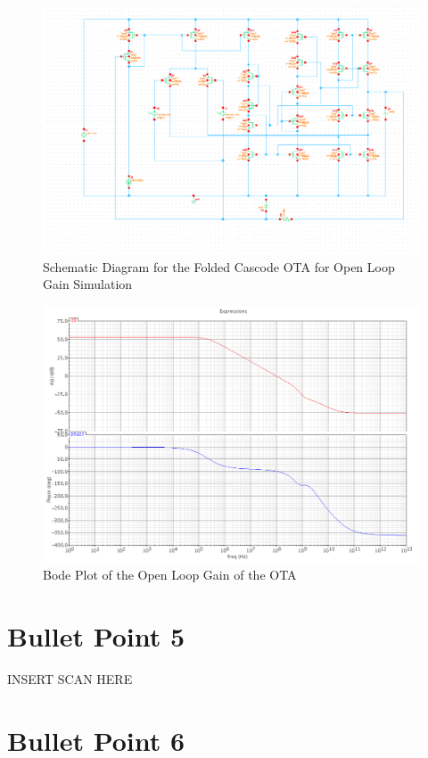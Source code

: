 \documentclass{article}
\begin{document}
\begin{figure}[H]
\centering
\includegraphics[width=7in]{bullet4_schem.png}
\caption{Schematic Diagram for the Folded Cascode OTA for Open Loop Gain Simulation}
\label{b4_schem}
\end{figure}

\begin{figure}[H]
\centering
\includegraphics[width=7in]{bullet4_bode.png}
\caption{Bode Plot of the Open Loop Gain of the OTA}
\label{b4_bode}
\end{figure}
\newpage

\section{Bullet Point 5}
INSERT SCAN HERE

\section{Bullet Point 6}
\end{document}
